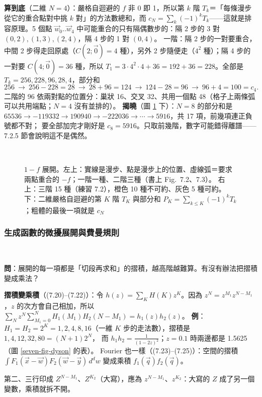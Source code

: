 \textbf{算到底}（二維 $N=4$）：嚴格自迴避的 $f$ 非 0 即 1，所以第 $k$ 階 $T_k$＝「每條漫步從它的重合點對中挑 $k$ 對」的方法數總和，而
$c_N=\sum_k(-1)^kT_k$——這就是排容原理。5 個點 $\vec w_0..\vec w_4$ 中可能重合的只有隔偶數步的：隔 2 步的 3 對 $(0,2),(1,3),(2,4)$，隔 4 步的 1 對 $(0,4)$。
一階：隔 2 步的一對要重合，中間 2 步得走回原處（$C(2;\vec0)=4$ 種），另外 2 步隨便走（$4^2$ 種）；隔 4 步的一對要 $C(4;\vec0)=36$ 種，所以
$T_1=3\cdot4^2\cdot4+36=192+36=228$。全部是 $T_k=256,228,96,28,4$，部分和
\[256\ \to\ 256-228=28\ \to\ 28+96=124\ \to\ 124-28=96\ \to\ 96+4=100=c_4 .\]
二階的 96 依兩對點的位置分：巢狀 16、交叉 32、共用一個點 48（格子上兩條弧可以共用端點；$N=4$ 沒有並排的）。
\textbf{揭曉}（圖 \ref{seven-fig-chord} 下）：$N=8$ 的部分和是 $65536\to-119332\to190940\to-222036\to\cdots\to5916$，共 17 項，前幾項連正負號都不對；
要全部加完才剛好是 $c_8=5916$。只取前幾階，數字可能錯得離譜——7.2.5 節會說明這不是偶然。

\begin{figure}[htbp]
\centering
\SevenFigChords\hfill\SevenFigThird\\[6pt]
{\footnotesize\setlength{\tabcolsep}{4pt}\SevenTabIE}
\caption{$1-f$ 展開。左上：實線是漫步、點是漫步上的位置、虛線弧＝要求兩點重合的 $-f$；一階一種、二階三種（書上 Fig.~7.2、7.3）。
右上：三階 15 種（練習 7.2），橙色 10 種不可約、灰色 5 種可約。下：二維嚴格自迴避的第 $K$ 階 $T_K$ 與部分和 $P_K=\sum_{k\le K}(-1)^kT_k$；粗體的最後一項就是 $c_N$}\label{seven-fig-chord}
\end{figure}

\subsubsection{生成函數的微擾展開與費曼規則}
\leavevmode{}\ \par\nopagebreak

\textbf{問}：展開的每一項都是「切段再求和」的摺積，越高階越難算。有沒有辦法把摺積變成乘法？

\textbf{摺積變乘積}（(7.20)--(7.22)）：令 $h(z)=\sum_KH(K)z^K$。因為 $z^N=z^{M_1}z^{N-M_1}$，$z$ 的次方會自己相加，所以
$\sum_Nz^N\sum_{M_1=0}^{N}\allowbreak H_1(M_1)H_2(N-M_1)=h_1(z)h_2(z)$。
\textbf{例}：$H_1=H_2=2^K=1,2,4,8,16$（一維 $K$ 步的走法數），摺積是 $1,4,12,32,80=(N+1)2^N$，
而 $h_1h_2=\frac1{(1-2z)^2}$；$z=0.1$ 時兩邊都是 1.5625（圖 \ref{seven-fig-dyson} 的表）。
Fourier 也一樣（(7.23)--(7.25)）：空間的摺積 $\int F_1(\vec x-\vec w)F_2(\vec w-\vec y)\,d^dw$ 變成乘積 $f_1(\vec q)f_2(\vec q)$。
\begin{errbox}[p.~176，(7.21)]
第二、三行印成 $Z^{N-M_1}$、$Z^{K_2}$（大寫），應為 $z^{N-M_1}$、$z^{K_2}$：大寫的 $Z$ 成了另一個變數，乘積就拆不開。
\end{errbox}

